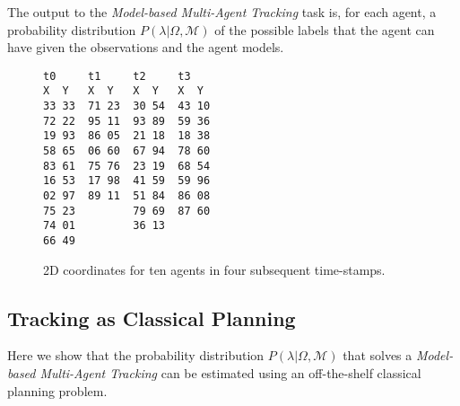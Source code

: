 \documentclass[letterpaper]{article} %
\begin{document}
The output to the {\em Model-based Multi-Agent Tracking} task is, for each agent, a probability distribution $P(\lambda|\Omega,\mathcal{M})$ of the possible labels that the agent can have given the observations and the agent models.


\begin{figure}
\begin{scriptsize}
\begin{verbatim}
t0     t1     t2     t3
X  Y   X  Y   X  Y   X  Y
33 33  71 23  30 54  43 10
72 22  95 11  93 89  59 36
19 93  86 05  21 18  18 38
58 65  06 60  67 94  78 60
83 61  75 76  23 19  68 54
16 53  17 98  41 59  59 96
02 97  89 11  51 84  86 08
75 23         79 69  87 60
74 01         36 13
66 49
\end{verbatim}
\end{scriptsize}
 \caption{\small 2D coordinates for ten agents in four subsequent time-stamps.}
\label{fig:observation}
\end{figure}





\subsection{Tracking as Classical Planning}
Here we show that the probability distribution $P(\lambda|\Omega,\mathcal{M})$ that solves a {\em Model-based Multi-Agent Tracking} can be estimated using an off-the-shelf classical planning problem.
\end{document}
